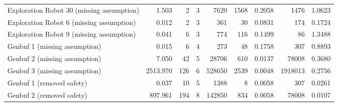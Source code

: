 \begin{tabular}{|l|rr|rr|rr|rr|}
  Exploration Robot 30 (missing assumption) & 1.503 & 2 & 3 & 7620 & 1568 & 0.2058 & 1476 & 1.0623 \\ 
  Exploration Robot 6 (missing assumption) & 0.012 & 2 & 3 & 361 & 30 & 0.0831 & 174 & 0.1724 \\ 
  Exploration Robot 9 (missing assumption) & 0.041 & 6 & 3 & 774 & 116 & 0.1499 & 86 & 1.3488 \\ 
  Genbuf 1 (missing assumption) & 0.015 & 6 & 4 & 273 & 48 & 0.1758 & 307 & 0.8893 \\ 
  Genbuf 2 (missing assumption) & 7.050 & 42 & 5 & 28706 & 610 & 0.0137 & 78008 & 0.3680 \\ 
  Genbuf 3 (missing assumption) & 2513.970 & 126 & 6 & 528650 & 2539 & 0.0048 & 1918013 & 0.2756 \\ 
  Genbuf 1 (removed safety) & 0.037 & 10 & 5 & 1388 & 8 & 0.0058 & 307 & 0.0261 \\ 
  Genbuf 2 (removed safety) & 897.961 & 194 & 8 & 142850 & 834 & 0.0058 & 78008 & 0.0107 \\ 
   \hline
\end{tabular}

